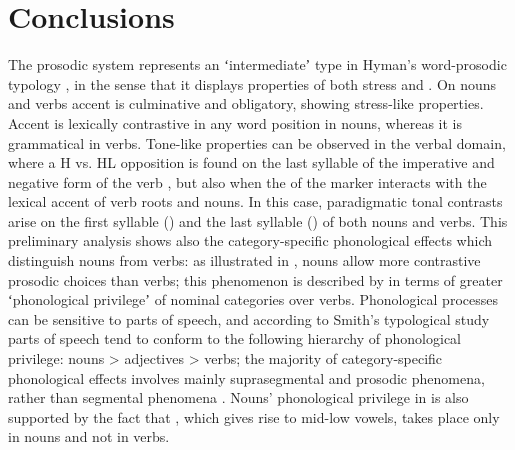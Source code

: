 \documentclass[output=paper]{LSP/langsci}
\begin{document}
\section{Conclusions} \label{sec:Petrollino:4}
The  prosodic system represents an ʻintermediateʼ type in Hyman's word-prosodic typology \citep{Hyman2006,Hyman2009}, in the sense that it displays properties of both stress and . On nouns and verbs accent is culminative and obligatory, showing stress-like properties. Accent is lexically contrastive in any word position in nouns, whereas it is grammatical in verbs. Tone-like properties can be observed in the verbal domain, where a H vs. HL opposition is found on the last syllable of the imperative and negative form of the verb , but also when the  of the   marker interacts with the lexical accent of verb roots and nouns. In this case, paradigmatic tonal contrasts arise on the first syllable () and the last syllable () of both nouns and verbs.
This preliminary analysis shows also the category-specific phonological effects which distinguish  nouns from verbs: as illustrated in ,  nouns allow more contrastive prosodic choices than verbs; this phenomenon is described by \citet{Smith2011} in terms of greater ʻphonological privilegeʼ of nominal categories over verbs. Phonological processes can be sensitive to parts of speech, and according to Smith's typological study parts of speech tend to conform to the following hierarchy of phonological privilege: nouns > adjectives > verbs; the majority of category-specific phonological effects involves mainly suprasegmental and prosodic phenomena, rather than segmental phenomena \citep[2448]{Smith2011}. Nouns' phonological privilege in  is also supported by the fact that , which gives rise to mid-low vowels, takes place only in nouns and not in verbs.
\end{document}
